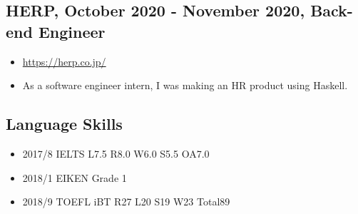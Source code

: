 \documentclass{article}
\begin{document}
  \subsection*{HERP, October 2020 - November 2020, Back-end Engineer}
    \begin{itemize}
      \item \url{https://herp.co.jp/}
      \item As a software engineer intern, I was making an HR product using Haskell.
    \end{itemize}

\subsection*{Language Skills}
  \begin{itemize}
    \item 2017/8 IELTS L7.5 R8.0 W6.0 S5.5 OA7.0
    \item 2018/1 EIKEN Grade 1
    \item 2018/9 TOEFL iBT R27 L20 S19 W23 Total89
  \end{itemize}
\end{document}
